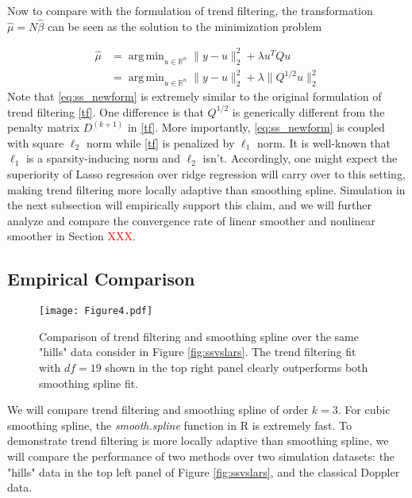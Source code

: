 \documentclass[a4paper]{article}
\DeclareMathOperator*{\argmin}{arg\,min}
\newcommand{\RR}{\mathbb{R}}
\begin{document}
Now to compare with the formulation of trend filtering, the transformation $\hat{\mu} = N\hat{\beta}$ can be seen as the solution to the minimization problem

\begin{equation}
\begin{aligned}
\hat{\mu} &= \argmin_{u\in\RR^n} \|y-u\|_2^2 + \lambda u^TQu\\
&= \argmin_{u\in\RR^n} \|y-u\|_2^2 + \lambda\|Q^{1/2}u\|_2^2
\label{eq:ss_newform}
\end{aligned}
\end{equation}
Note that \eqref{eq:ss_newform} is extremely similar to the original formulation of trend filtering \eqref{tf}. One difference is that $Q^{1/2}$ is generically different from the penalty matrix $D^{(k+1)}$ in \eqref{tf}. More importantly, \eqref{eq:ss_newform} is coupled with square $\ell_2$ norm while \eqref{tf} is penalized by $\ell_1$ norm. It is well-known that $\ell_1$ is a sparsity-inducing norm and $\ell_2$ isn't. Accordingly, one might expect the superiority of Lasso regression over ridge regression will carry over to this setting, making trend filtering more locally adaptive than smoothing spline. Simulation in the next subsection will empirically support this claim, and we will further analyze and compare the convergence rate of linear smoother and nonlinear smoother in Section \textcolor{red}{XXX}.

\subsection{Empirical Comparison}
\label{subsec:sssimu}
\begin{figure}[t]
\centering
\texttt{[image: Figure4.pdf]}
\caption{Comparison of trend filtering and smoothing spline over the same "hills" data consider in Figure \ref{fig:ssvslars}. The trend filtering fit with $df = 19$ shown in the top right panel clearly outperforms both smoothing spline fit.}
\label{fig:Figure4_ssvstfhills}
\end{figure}

We will compare trend filtering and smoothing spline of order $k = 3$. For cubic smoothing spline, the \textit{smooth.spline} function in R is extremely fast. To demonstrate trend filtering is more locally adaptive than smoothing spline, we will compare the performance of two methods over two simulation datasets: the "hills" data in the top left panel of Figure \ref{fig:ssvslars}, and the classical Doppler data. 
\end{document}
